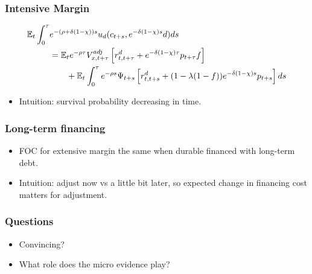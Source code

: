 \documentclass[english,xcolor=svgnames]{beamer}
\begin{document}
\begin{frame}
    \frametitle{Intensive Margin}
\begin{align*}
		\mathbb{E}_t\int_0^{\tau} &e^{-(\rho+\delta(1-\chi)) s} u_d(c_{t+s},e^{-\delta(1-\chi) s}d)ds \\
		&=   \mathbb{E}_t e^{-\rho \tau}V_{x,t+\tau}^{adj}\left[r^d_{t,t+\tau}  + e^{-\delta(1-\chi) \tau}p_{t+\tau} f\right] \\
		& \qquad + \mathbb{E}_t\int_0^{\tau}e^{-\rho s}\Psi_{t+s}\left[r^d_{t,t+s} + (1-\lambda(1-f))e^{-\delta(1-\chi)s}p_{t+s}\right]ds \\
	\end{align*}
\begin{itemize}
	\item Intuition: survival probability decreasing in time.
\end{itemize}
\end{frame}

\begin{frame}
    \frametitle{Long-term financing}
\begin{itemize}
	\item FOC for extensive margin the same when durable financed with long-term debt.
	\item Intuition: adjust now vs a little bit later, so expected change in financing cost matters for adjustment.
\end{itemize}
\end{frame}

\begin{frame}
    \frametitle{Questions}
	\begin{itemize}
		\item Convincing?
		\item What role does the micro evidence play?
	\end{itemize}
\end{frame}
\end{document}

